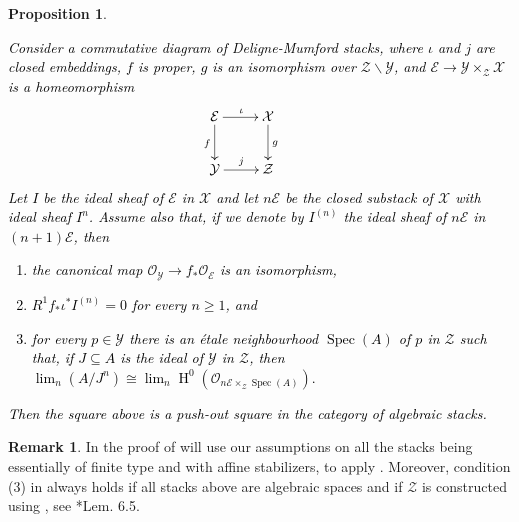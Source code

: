 \documentclass{amsart}
\newcommand{\oH}{\operatorname{H}}
\newcommand{\cE}{\mathcal{E}}
\newcommand{\cO}{\mathcal{O}}
\newcommand{\cX}{\mathcal{X}}
\newcommand{\cY}{\mathcal{Y}}
\newcommand{\cZ}{\mathcal{Z}}
\newcommand{\spec}{\operatorname{Spec}}
\newtheorem{Prop}[theorem]{Proposition}
\theoremstyle{definition}
\newtheorem{Remark}[theorem]{Remark}
\begin{document}
\begin{Prop}\label{prop_pushout_criteria}
    \textcolor{black}{Consider a commutative diagram of Deligne-Mumford stacks, where $\iota$ and $j$ are closed embeddings, $f$ is proper, $g$ is an isomorphism over $\cZ\smallsetminus \cY$, and $\cE\to \cY\times_\cZ\cX$ is a homeomorphism
     $$\xymatrix{\cE\ar[d]_f \ar[r]^\iota & \cX\ar[d]^g &\\ \cY\ar[r]^j&\cZ &}$$ 
     Let $I$ be the ideal sheaf of $\cE$ in $\cX$ and let $n\cE$ be the closed substack of $\cX$ with ideal sheaf $I^n$. 
Assume also that, if we denote by $I^{(n)}$ the ideal sheaf of $n\cE$ in $(n+1)\cE$, then \begin{enumerate}
    \item the canonical map $\cO_\cY\to f_*\cO_\cE$ is an isomorphism, \item$R^1f_*\iota^*I^{(n)}=0$ for every $n\ge 1$, and
    \item for every $p\in \cY$ there is an \'etale neighbourhood $\spec(A)$ of $p$ in $\cZ$ such that, if $J\subseteq A$ is the ideal of $\cY$ in $\cZ$, then $\lim_n(A/J^n)\cong \lim_n\oH^0(\cO_{n\cE\times_{\cZ}\spec(
A)}).$ 
\end{enumerate}
 Then the square above is a push-out square in the category of algebraic stacks. 
}
\end{Prop}
\begin{Remark}
    In the proof of  will use our assumptions on all the stacks being essentially of finite type and with affine stabilizers, to apply \cites{mayer_viet_squares,HR19}. Moreover, condition (3) in  always holds if all stacks above are algebraic spaces and if $\cZ$ is constructed using \cite{artin1970algebraization}, see \cite{artin1970algebraization}*{Lem. 6.5}.
\end{Remark}
\end{document}
